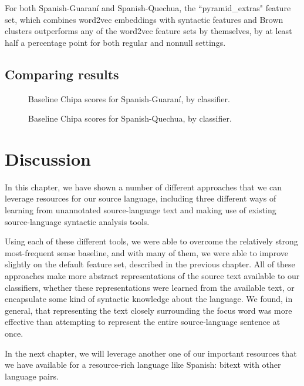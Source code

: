 For both Spanish-Guaraní and Spanish-Quechua, the ``pyramid\_extras" feature
set, which combines word2vec embeddings with syntactic features and Brown
clusters outperforms any of the word2vec feature sets by themselves, by at
least half a percentage point for both regular and nonnull settings. 

\subsection{Comparing results}
\begin{figure}
  \caption{Baseline Chipa scores for Spanish-Guaraní, by classifier.}
  \label{fig:esgnresults:monolingual}
\end{figure}

\begin{figure}
  \caption{Baseline Chipa scores for Spanish-Quechua, by classifier.}
  \label{fig:esquresults:monolingual}
\end{figure}


\section{Discussion}
In this chapter, we have shown a number of different approaches that we can
leverage resources for our source language, including three different ways of
learning from unannotated source-language text and making use of existing
source-language syntactic analysis tools.

Using each of these different tools, we were able to overcome the relatively
strong most-frequent sense baseline, and with many of them, we were able to
improve slightly on the default feature set, described in the previous chapter.
All of these approaches make more abstract representations of the source text
available to our classifiers, whether these representations were learned from
the available text, or encapsulate some kind of syntactic knowledge about the
language. We found, in general, that representing the text closely surrounding
the focus word was more effective than attempting to represent the entire
source-language sentence at once.

In the next chapter, we will leverage another one of our important resources
that we have available for a resource-rich language like Spanish: bitext with
other language pairs.
